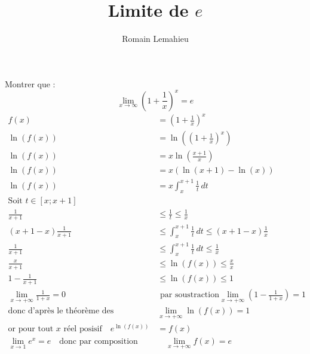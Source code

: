 \documentclass{exam}
\title{Limite de $e$}
\author{Romain Lemahieu}
\begin{document}
\maketitle
Montrer que :
$$
\lim_{x \to \infty} \left(1+\frac{1}{x}\right)^x=e
$$
\begin{align*}
f(x)&=\left(1+\frac{1}{x}\right)^x
\\
\ln(f(x))&=\ln\left(\left(1+\frac{1}{x}\right)^x\right)
\\
\ln(f(x))&=x\ln\left(\frac{x+1}{x}\right)
\\
\ln(f(x))&=x(\ln(x+1)-\ln(x))
\\
\ln(f(x))&=x\int_{x}^{x+1}\frac{1}{t}\,dt
\\
\text{Soit $t \in [x; x+1]$}
\\
\frac{1}{x+1}
&\le
\frac{1}{t}
\le
\frac{1}{x}
\\
(x+1-x)\frac{1}{x+1}
&\le
\int_{x}^{x+1}\frac{1}{t}\,dt
\le
(x+1-x)\frac{1}{x}
\\
\frac{1}{x+1}
&\le
\int_{x}^{x+1}\frac{1}{t}\,dt
\le
\frac{1}{x}
\\
\frac{x}{x+1}
&\le
\ln(f(x))
\le
\frac{x}{x}
\\
1-\frac{1}{x+1}
&\le
\ln(f(x))
\le
1
\\
\lim_{x \to +\infty}\frac{1}{1+x}=0
&\text{ par soustraction}
\lim_{x \to +\infty}\left(1-\frac{1}{1+x}\right)=1
\\
\text{donc d'après le théorème des gendarmes}
\quad
&\lim_{x \to +\infty} \ln(f(x))=1
\\
\text{or pour tout $x$ réel posisif}
\quad
e^{\ln(f(x))}&=f(x)
\\
\lim_{x \to 1} e^x=e
\quad
\text{donc par composition}
&\quad
\lim_{x \to +\infty} f(x)=e
\end{align*}
\end{document}
